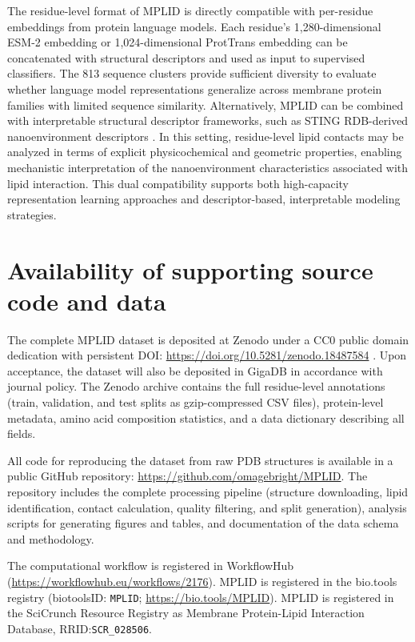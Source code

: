 \documentclass[unnumsec,webpdf,contemporary,large]{oup-authoring-template}
\begin{document}
The residue-level format of MPLID is directly compatible with per-residue embeddings from protein language models. Each residue's 1,280-dimensional ESM-2 embedding \cite{lin2023} or 1,024-dimensional ProtTrans embedding \cite{elnaggar2022} can be concatenated with structural descriptors and used as input to supervised classifiers. The 813 sequence clusters provide sufficient diversity to evaluate whether language model representations generalize across membrane protein families with limited sequence similarity. Alternatively, MPLID can be combined with interpretable structural descriptor frameworks, such as STING RDB-derived nanoenvironment descriptors \cite{neshich2003, neshich2006}. In this setting, residue-level lipid contacts may be analyzed in terms of explicit physicochemical and geometric properties, enabling mechanistic interpretation of the nanoenvironment characteristics associated with lipid interaction. This dual compatibility supports both high-capacity representation learning approaches and descriptor-based, interpretable modeling strategies.


\section{Availability of supporting source code and data}

The complete MPLID dataset is deposited at Zenodo under a CC0 public domain dedication with persistent DOI: \url{https://doi.org/10.5281/zenodo.18487584} \cite{zenodo_mplid}. Upon acceptance, the dataset will also be deposited in GigaDB in accordance with journal policy. The Zenodo archive contains the full residue-level annotations (train, validation, and test splits as gzip-compressed CSV files), protein-level metadata, amino acid composition statistics, and a data dictionary describing all fields.

All code for reproducing the dataset from raw PDB structures is available in a public GitHub repository: \url{https://github.com/omagebright/MPLID}. The repository includes the complete processing pipeline (structure downloading, lipid identification, contact calculation, quality filtering, and split generation), analysis scripts for generating figures and tables, and documentation of the data schema and methodology.

The computational workflow is registered in WorkflowHub (\url{https://workflowhub.eu/workflows/2176}). MPLID is registered in the bio.tools registry (biotoolsID: \texttt{MPLID}; \url{https://bio.tools/MPLID}). MPLID is registered in the SciCrunch Resource Registry as Membrane Protein-Lipid Interaction Database, RRID:\texttt{SCR\_028506}.
\end{document}

